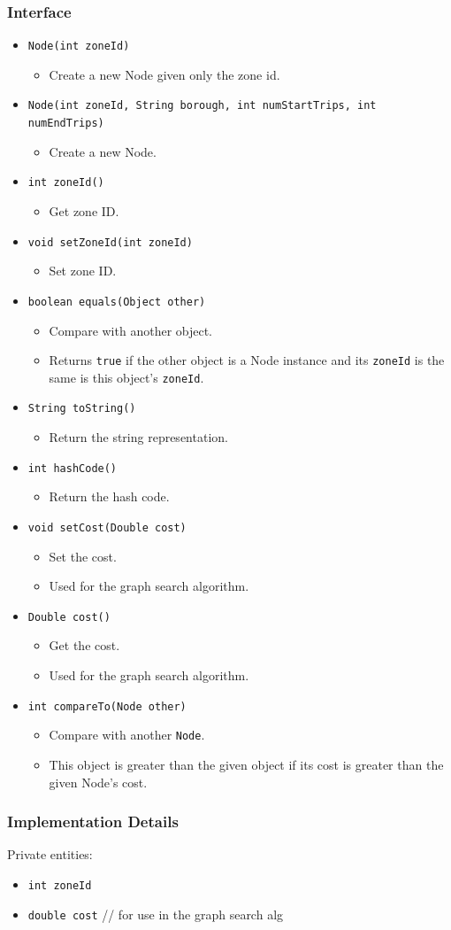 \documentclass[12pt]{article}
\newcommand{\bi}{\begin{itemize}}
\newcommand{\ei}{\end{itemize}}
\newcommand{\code}[1]{\texttt{#1}}
\begin{document}
\subsubsection{Interface}
\bi
	\item \code{Node(int zoneId)}
	\bi
		\item Create a new Node given only the zone id.
	\ei
	\item \code{Node(int zoneId, String borough, int numStartTrips, int numEndTrips)}
	\bi
		\item Create a new Node.
	\ei
	\item \code{int zoneId()}
	\bi
		\item Get zone ID.
	\ei
	\item \code{void setZoneId(int zoneId)}
	\bi
		\item Set zone ID.
	\ei
	\item \code{boolean equals(Object other)}
	\bi
		\item Compare with another object.
		\item Returns \code{true} if the other object is a Node instance and its
		\code{zoneId} is the same is this object's \code{zoneId}.
	\ei
	\item \code{String toString()}
	\bi
		\item Return the string representation.
	\ei
	\item \code{int hashCode()}
	\bi
		\item Return the hash code.
	\ei
	\item \code{void setCost(Double cost)}
	\bi
		\item Set the cost. 
		\item Used for the graph search algorithm.
	\ei
	\item \code{Double cost()}
	\bi
		\item Get the cost.
		\item Used for the graph search algorithm.
	\ei
	\item \code{int compareTo(Node other)}
	\bi
		\item Compare with another \code{Node}.
		\item This object is greater than the given object if its cost is greater than the given Node's cost. 
	\ei
\ei

\subsubsection{Implementation Details}

Private entities:
\bi
	\item \code{int zoneId}
	\item \code{double cost} // for use in the graph search alg
\ei
\end{document}
